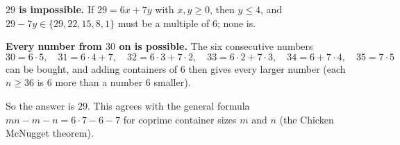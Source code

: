 \textbf{$29$ is impossible.} If $29=6x+7y$ with $x,y\ge0$, then $y\le4$, and $29-7y\in\{29,22,15,8,1\}$ must be a multiple of $6$; none is.

\textbf{Every number from $30$ on is possible.} The six consecutive numbers
\[
30=6\cdot5,\quad31=6\cdot4+7,\quad32=6\cdot3+7\cdot2,\quad33=6\cdot2+7\cdot3,\quad34=6+7\cdot4,\quad35=7\cdot5
\]
can be bought, and adding containers of $6$ then gives every larger number (each $n\ge36$ is $6$ more than a number $6$ smaller).

So the answer is $\boxed{29}$. This agrees with the general formula $mn-m-n=6\cdot7-6-7$ for coprime container sizes $m$ and $n$ (the Chicken McNugget theorem).
